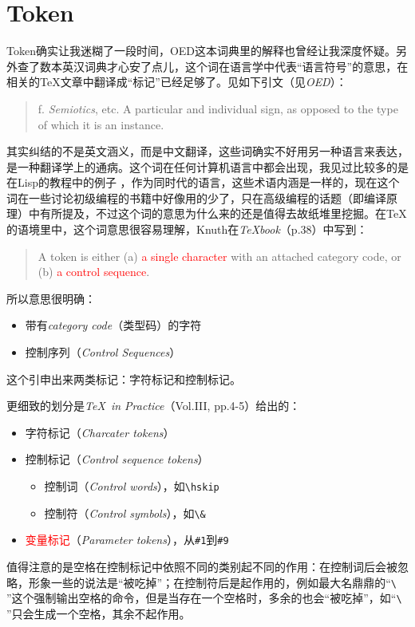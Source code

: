 \documentclass{article}
\newcommand{\Rtxt}[1]{\textcolor{red}{#1}}
\newcommand{\TeXbook}{\textit{\TeX book}}
\newcommand{\TIP}{\textit{\TeX\ in Practice}}
\begin{document}
\section{Token}
Token确实让我迷糊了一段时间，OED这本词典里的解释也曾经让我深度怀疑。另外查了数本英汉词典才心安了点儿，这个词在语言学中代表“语言符号”的意思，在相关的\TeX 文章中翻译成“标记”已经足够了。见如下引文（见\textit{OED}）：
\begin{quotation}
f. \textsl{Semiotics}, etc. A particular and individual sign, as opposed to the type of which it is an instance.
\end{quotation}
其实纠结的不是英文涵义，而是中文翻译，这些词确实不好用另一种语言来表达，是一种翻译学上的通病。这个词在任何计算机语言中都会出现，我见过比较多的是在Lisp的教程中的例子 ，作为同时代的语言，这些术语内涵是一样的，现在这个词在一些讨论初级编程的书籍中好像用的少了，只在高级编程的话题（即编译原理）中有所提及，不过这个词的意思为什么来的还是值得去故纸堆里挖掘。在\TeX 的语境里中，这个词意思很容易理解，Knuth在\TeXbook（p.38）中写到：
\begin{quotation}
A token is either (a) \Rtxt{a single character} with an attached category code, or (b) \Rtxt{a control sequence}.
\end{quotation}
所以意思很明确：
\begin{itemize}
\item 带有\textit{category code}（类型码）的字符
\item 控制序列（\textit{Control Sequences}）
\end{itemize}
这个引申出来两类标记：字符标记和控制标记。

更细致的划分是\TIP（Vol.III, pp.4-5）给出的：
\begin{itemize}
\item 字符标记（\textit{Charcater tokens}）
\item 控制标记（\textit{Control sequence tokens}）
\begin{itemize}
\item 控制词（\textit{Control words}），如\verb!\hskip!
\item 控制符（\textit{Control symbols}），如\verb!\&!
\end{itemize}
\item \Rtxt{变量标记}（\textit{Parameter tokens}），从\verb!#1!到\verb!#9!
\end{itemize}
值得注意的是空格在控制标记中依照不同的类别起不同的作用：在控制词后会被忽略，形象一些的说法是“被吃掉”；在控制符后是起作用的，例如最大名鼎鼎的“\verb*!\ !”这个强制输出空格的命令，但是当存在一个空格时，多余的也会“被吃掉”，如“\verb*!\   !”只会生成一个空格，其余不起作用。
\end{document}
